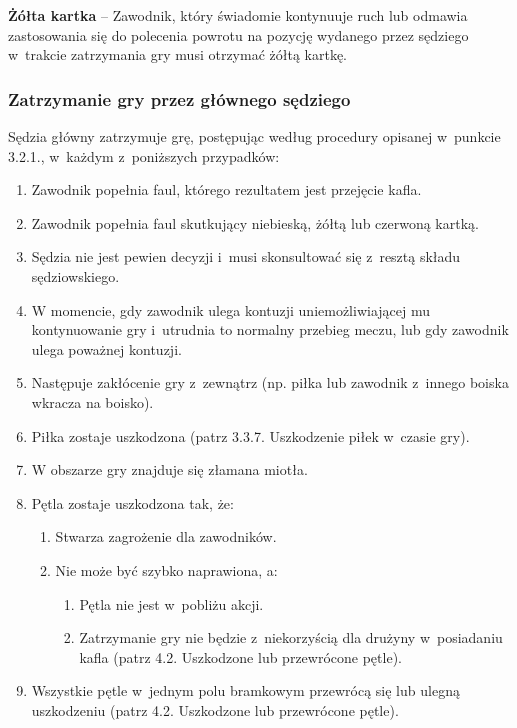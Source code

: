 \documentclass[12pt,a4paper]{article}
\newcommand\yellowcard[1]{\bgroup\textcolor{darkyellow}{\textbf{#1}}}
\begin{document}
\yellowcard{Żółta kartka} -- Zawodnik, który świadomie kontynuuje ruch lub
odmawia zastosowania się do polecenia powrotu na pozycję wydanego przez
sędziego w~trakcie zatrzymania gry musi otrzymać żółtą kartkę.

\subsubsection{Zatrzymanie gry przez głównego sędziego}

Sędzia główny zatrzymuje grę, postępując według procedury opisanej w~punkcie 3.2.1., w~każdym z~poniższych przypadków:

\begin{enumerate}
	\item Zawodnik popełnia faul, którego rezultatem jest przejęcie kafla.

	\item Zawodnik popełnia faul skutkujący niebieską, żółtą lub czerwoną
	      kartką.

	\item Sędzia nie jest pewien decyzji i~musi skonsultować się z~resztą
	      składu sędziowskiego.

	\item W momencie, gdy zawodnik ulega kontuzji uniemożliwiającej mu
	      kontynuowanie gry i~utrudnia to normalny przebieg meczu, lub gdy
	      zawodnik ulega poważnej kontuzji.

	\item Następuje zakłócenie gry z~zewnątrz (np. piłka lub zawodnik z~innego
	      boiska wkracza na boisko).

	\item Piłka zostaje uszkodzona (patrz 3.3.7. Uszkodzenie piłek w~czasie
	      gry).

	\item W obszarze gry znajduje się złamana miotła.

	\item Pętla zostaje uszkodzona tak, że:
	      \begin{enumerate}
		      \item Stwarza zagrożenie dla zawodników.

		      \item Nie może być szybko naprawiona, a:

		            \begin{enumerate}
			            \item
			                  Pętla nie jest w~pobliżu akcji.
			            \item
			                  Zatrzymanie gry nie będzie z~niekorzyścią dla drużyny w~posiadaniu
			                  kafla (patrz 4.2. Uszkodzone lub przewrócone pętle).
		            \end{enumerate}
	      \end{enumerate}
	\item Wszystkie pętle w~jednym polu bramkowym przewrócą się lub ulegną
	      uszkodzeniu (patrz 4.2. Uszkodzone lub przewrócone pętle).


\end{enumerate}
\end{document}
